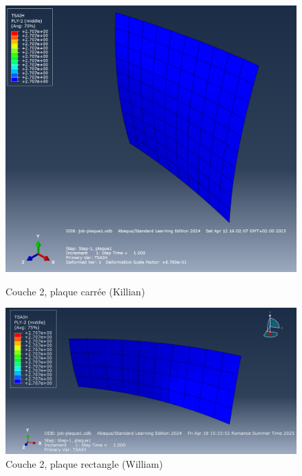 \documentclass[a4paper,12pt]{article}
\begin{document}
\begin{figure}[h!]
	\centering
	\begin{minipage}[t][0.3\textheight]{0.495\textwidth}
		\centering
		\includegraphics[width=\textwidth]{media/K_P1_L2_12042025.png} %
		\caption{Couche 2, plaque carrée (Killian)}
		\label{fig:image1}
	\end{minipage}
	\hfill
	\begin{minipage}[t][0.3\textheight]{0.495\textwidth}
		\centering
		\includegraphics[width=\textwidth]{media/Couche2_.png} %
		\caption{Couche 2, plaque rectangle (William)}
		\label{fig:image2}
	\end{minipage}
\end{figure}
\clearpage
\end{document}
